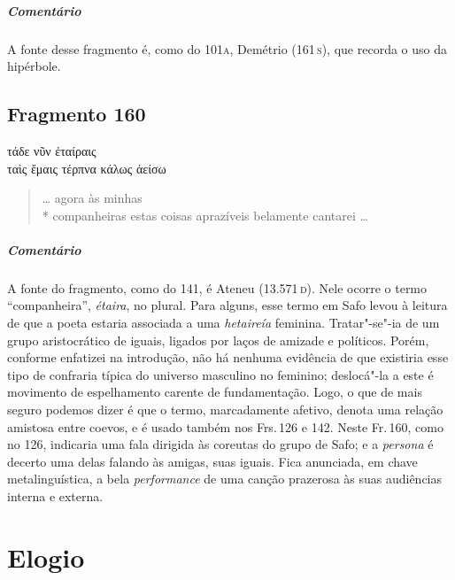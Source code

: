\medskip

{\paragraph{Comentário} A fonte desse fragmento é, como do 101\textsc{a}, Demétrio (161\,\textsc{s}), que recorda o uso da
hipérbole.}

\pagebreak
\section{Fragmento 160}

\begin{gkverse}
τάδε νῦν ἐταίραις\\
ταὶς ἔμαις \dagger{}τέρπνα\dagger{} κάλως ἀείσω
\end{gkverse}

\begin{verse}
\ldots{} agora às minhas\\*
companheiras estas coisas aprazíveis belamente cantarei \ldots{}
\end{verse}

\medskip

{\paragraph{Comentário} A fonte do fragmento, como do 141, é Ateneu (13.571\,\textsc{d}). Nele ocorre o termo ``companheira'', \textit{étaira}, no plural.
Para alguns, esse termo em Safo levou à leitura de que a poeta estaria associada a uma \textit{hetaireía} feminina. Tratar"-se"-ia de um grupo aristocrático de iguais, ligados por laços de amizade e políticos. Porém, conforme enfatizei na introdução, não há nenhuma evidência de que existiria esse tipo de confraria típica do universo masculino no feminino; deslocá"-la a este é movimento de espelhamento carente de fundamentação. Logo, o que de mais seguro podemos dizer é que o termo, marcadamente afetivo, denota uma relação amistosa entre coevos, e é usado também nos Frs.\,126 e 142. Neste Fr.\,160, como no 126, indicaria uma fala dirigida às coreutas do grupo de Safo; e a \textit{persona} é decerto uma delas falando às amigas, suas iguais. Fica anunciada, em chave metalinguística, a bela \textit{performance}
de uma canção prazerosa às suas audiências interna e externa.}


\chapter{Elogio}

